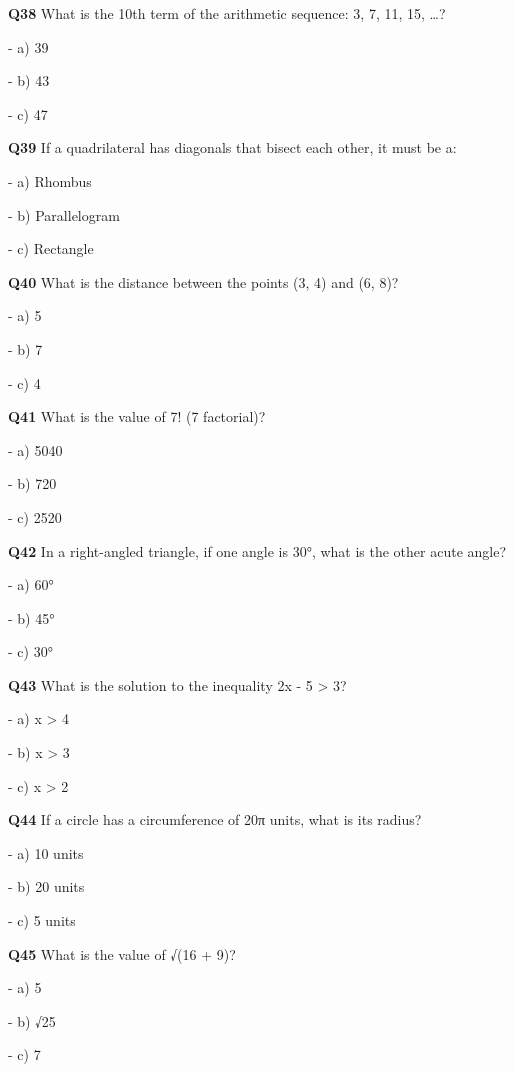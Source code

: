 \textbf{Q38} What is the 10th term of the arithmetic sequence: 3, 7, 11, 15, …?\par
\quad - a) 39\par
\quad - b) 43\par
\quad - c) 47\par

\textbf{Q39} If a quadrilateral has diagonals that bisect each other, it must be a:\par
\quad - a) Rhombus\par
\quad - b) Parallelogram\par
\quad - c) Rectangle\par

\textbf{Q40} What is the distance between the points (3, 4) and (6, 8)?\par
\quad - a) 5\par
\quad - b) 7\par
\quad - c) 4\par

\textbf{Q41} What is the value of 7! (7 factorial)?\par
\quad - a) 5040\par
\quad - b) 720\par
\quad - c) 2520\par

\textbf{Q42} In a right-angled triangle, if one angle is 30°, what is the other acute angle?\par
\quad - a) 60°\par
\quad - b) 45°\par
\quad - c) 30°\par

\textbf{Q43} What is the solution to the inequality 2x - 5 > 3?\par
\quad - a) x > 4\par
\quad - b) x > 3\par
\quad - c) x > 2\par

\textbf{Q44} If a circle has a circumference of 20π units, what is its radius?\par
\quad - a) 10 units\par
\quad - b) 20 units\par
\quad - c) 5 units\par

\textbf{Q45} What is the value of √(16 + 9)?\par
\quad - a) 5\par
\quad - b) √25\par
\quad - c) 7\par

